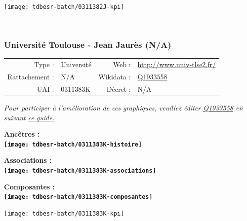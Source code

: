 \documentclass[12pt,french,]{article}
\begin{document}
\begin{center}\texttt{[image: tdbesr-batch/0311382J-kpi]} \end{center}\checkoddpage

\ifoddpage \fi ~\newpage  

\hypertarget{universituxe9-toulouse---jean-jauruxe8s-na}{%
\subsubsection{Université Toulouse - Jean Jaurès
(N/A)}\label{universituxe9-toulouse---jean-jauruxe8s-na}}

\begin{tabular*}{\textwidth}{rp{5cm}rl}  
\hline  
Type : & Université & Web : &\href{http://www.univ-tlse2.fr/}{http://www.univ-tlse2.fr/} \\  
Rattachement : & N/A & Wikidata : & \href{https://www.wikidata.org/entity/Q1933558}{Q1933558} \\  
UAI : & 0311383K & Décret : & N/A \\  
\hline  
\end{tabular*}

\textit{\scriptsize Pour participer à l'amélioration de ces graphiques, veuillez éditer  \href{https://www.wikidata.org/entity/Q1933558}{Q1933558}  en suivant \href{https://github.com/cpesr/wikidataESR/blob/master/Rmd/wikidataESR.md}{ce guide.}}

\vspace{1cm}  
\begin{minipage}[b]{0.50\textwidth}\begin{center} \bf Ancêtres : \\  
\texttt{[image: tdbesr-batch/0311383K-histoire]} \end{center}\end{minipage}\begin{minipage}[b]{0.50\textwidth}\begin{center} \bf Associations : \\  
\texttt{[image: tdbesr-batch/0311383K-associations]} \end{center}\end{minipage}

\hrulefill

\begin{center} \bf Composantes : \\  
\texttt{[image: tdbesr-batch/0311383K-composantes]} \end{center}

\begin{center}\texttt{[image: tdbesr-batch/0311383K-kpi]} \end{center}\checkoddpage
\end{document}
